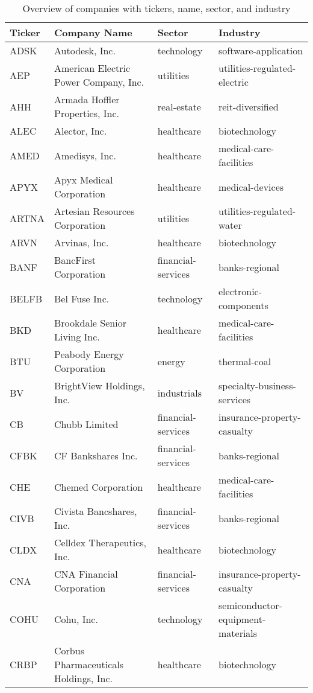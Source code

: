 \begin{table}[H]
\centering
\small
\caption{Overview of companies with tickers, name, sector, and industry}
\label{tab:appendix_A}
\begin{tabular}{llll}
\toprule
Ticker & Company Name & Sector & Industry \\
\midrule
ADSK & Autodesk, Inc. & technology & software-application \\
AEP & American Electric Power Company, Inc. & utilities & utilities-regulated-electric \\
AHH & Armada Hoffler Properties, Inc. & real-estate & reit-diversified \\
ALEC & Alector, Inc. & healthcare & biotechnology \\
AMED & Amedisys, Inc. & healthcare & medical-care-facilities \\
APYX & Apyx Medical Corporation & healthcare & medical-devices \\
ARTNA & Artesian Resources Corporation & utilities & utilities-regulated-water \\
ARVN & Arvinas, Inc. & healthcare & biotechnology \\
BANF & BancFirst Corporation & financial-services & banks-regional \\
BELFB & Bel Fuse Inc. & technology & electronic-components \\
BKD & Brookdale Senior Living Inc. & healthcare & medical-care-facilities \\
BTU & Peabody Energy Corporation & energy & thermal-coal \\
BV & BrightView Holdings, Inc. & industrials & specialty-business-services \\
CB & Chubb Limited & financial-services & insurance-property-casualty \\
CFBK & CF Bankshares Inc. & financial-services & banks-regional \\
CHE & Chemed Corporation & healthcare & medical-care-facilities \\
CIVB & Civista Bancshares, Inc. & financial-services & banks-regional \\
CLDX & Celldex Therapeutics, Inc. & healthcare & biotechnology \\
CNA & CNA Financial Corporation & financial-services & insurance-property-casualty \\
COHU & Cohu, Inc. & technology & semiconductor-equipment-materials \\
CRBP & Corbus Pharmaceuticals Holdings, Inc. & healthcare & biotechnology \\

\end{tabular}
\end{table}
